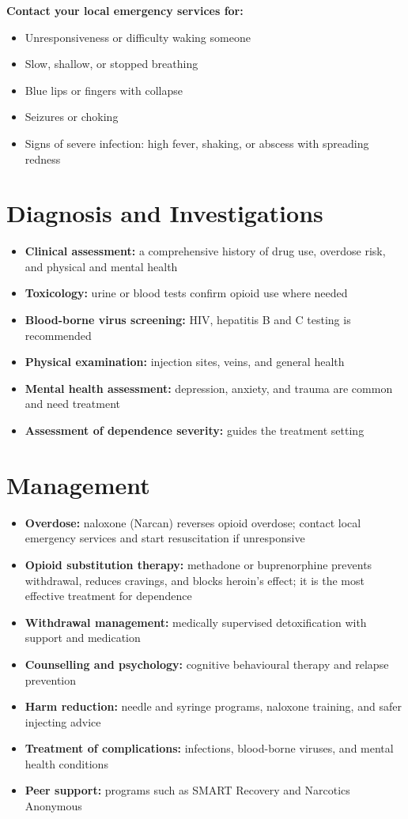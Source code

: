 \textbf{Contact your local emergency services for:}
\begin{itemize}
    \item Unresponsiveness or difficulty waking someone
    \item Slow, shallow, or stopped breathing
    \item Blue lips or fingers with collapse
    \item Seizures or choking
    \item Signs of severe infection: high fever, shaking, or abscess with spreading redness
\end{itemize}

\section*{Diagnosis and Investigations}
\begin{itemize}
    \item \textbf{Clinical assessment:} a comprehensive history of drug use, overdose risk, and physical and mental health
    \item \textbf{Toxicology:} urine or blood tests confirm opioid use where needed
    \item \textbf{Blood-borne virus screening:} HIV, hepatitis B and C testing is recommended
    \item \textbf{Physical examination:} injection sites, veins, and general health
    \item \textbf{Mental health assessment:} depression, anxiety, and trauma are common and need treatment
    \item \textbf{Assessment of dependence severity:} guides the treatment setting
\end{itemize}

\section*{Management}
\begin{itemize}
    \item \textbf{Overdose:} naloxone (Narcan) reverses opioid overdose; contact local emergency services and start resuscitation if unresponsive
    \item \textbf{Opioid substitution therapy:} methadone or buprenorphine prevents withdrawal, reduces cravings, and blocks heroin's effect; it is the most effective treatment for dependence
    \item \textbf{Withdrawal management:} medically supervised detoxification with support and medication
    \item \textbf{Counselling and psychology:} cognitive behavioural therapy and relapse prevention
    \item \textbf{Harm reduction:} needle and syringe programs, naloxone training, and safer injecting advice
    \item \textbf{Treatment of complications:} infections, blood-borne viruses, and mental health conditions
    \item \textbf{Peer support:} programs such as SMART Recovery and Narcotics Anonymous
\end{itemize}


